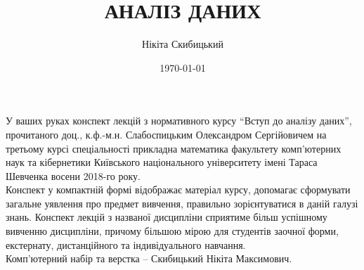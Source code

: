 \documentclass[a4paper, 12pt]{article}
\title{{\Huge АНАЛІЗ ДАНИХ}}
\author{Нікіта Скибицький}
\date{\today}
\begin{document}
\maketitle \thispagestyle{empty} \newpage 
У ваших руках конспект лекцій з нормативного курсу ``Вступ до аналізу даних'', прочитаного доц., к.ф.-м.н. Слабоспицьким Олександром Сергійовичем на третьому курсі спеціальності прикладна математика факультету комп'ютерних наук та кібернетики Київського національного університету імені Тараса Шевченка восени 2018-го року. \\

Конспект у компактній формі відображає матеріал курсу, допомагає сформувати загальне уявлення про предмет вивчення, правильно зорієнтуватися в даній галузі знань. Конспект лекцій з названої дисципліни сприятиме більш успішному вивченню дисципліни, причому більшою мірою для студентів заочної форми, екстернату, дистанційного та індивідуального навчання. \\

Комп'ютерний набір та верстка -- Скибицький Нікіта Максимович. \newpage
\tableofcontents \newpage













\end{document}
